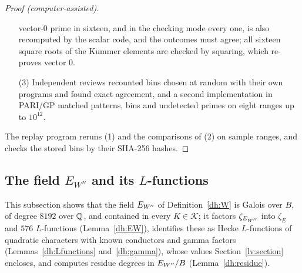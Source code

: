 \begin{proof}[Proof (computer-assisted)]
\begin{enumerate}
 vector-$0$ prime in sixteen, and in the checking mode every one, is also
 recomputed by the scalar code, and the outcomes must agree; all sixteen
 square roots of the Kummer elements are checked by squaring, which
 re-proves vector $0$.
\item[(3)] Independent reviews recounted bins chosen at random with their own
 programs and found exact agreement, and a second implementation in PARI/GP
 matched patterns, bins and undetected primes on eight ranges up to
 $10^{12}$.
\end{enumerate}
The replay program reruns (1) and the comparisons of (2) on sample ranges,
and checks the stored bins by their SHA-256 hashes.
\end{proof}

\subsection{\texorpdfstring{The field $E_{W''}$ and its $L$-functions}{The field E\_W'' and its L-functions}}
\label{dh:EW-section}
This subsection shows that the field $E_{W''}$ of Definition~\ref{dh:W} is
Galois over $B$, of degree $8192$ over $\mathbb Q$, and contained in every
$K\in\mathcal K$; it factors $\zeta_{E_{W''}}$ into $\zeta_E$ and $576$
$L$-functions (Lemma~\ref{dh:EW}), identifies these as Hecke $L$-functions
of quadratic characters with known conductors and gamma factors
(Lemmas~\ref{dh:Lfunctions} and~\ref{dh:gamma}), whose values
Section~\ref{lv:section} encloses, and computes residue degrees in $E_{W''}/B$
(Lemma~\ref{dh:residue}).

